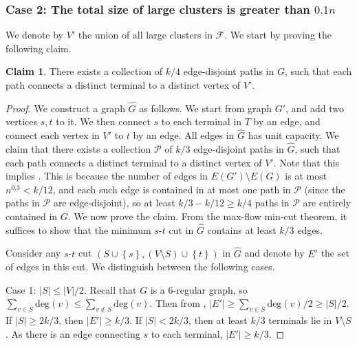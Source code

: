 \documentclass[11pt]{article}
\theoremstyle{definition}
\newtheorem{claim}[theorem]{Claim}
\newcommand{\set}[1]{\left\{ #1 \right\}}
\newcommand{\pset}{{\mathcal{P}}}
\newcommand{\fset}{{\mathcal{F}}}
\def\card#1{\left| #1 \right|}
\def\deg{\textrm{deg}}
\newcounter{note}
\begin{document}
\begin{titlepage}

\subsubsection*{Case 2: The total size of large clusters is greater than $0.1n$}

We denote by $V'$ the union of all large clusters in $\fset$.
We start by proving the following claim.

\begin{claim} \label{clm:paths}
There exists a collection of $k/4$ edge-disjoint paths in $G$, such that each path connects a distinct terminal to a distinct vertex of $V'$.
\end{claim}

\begin{proof}
We construct a graph $\hat G$ as follows. We start from graph $G'$, and add two vertices $s,t$ to it. We then connect $s$ to each terminal in $T$ by an edge, and connect each vertex in $V'$ to $t$ by an edge. All edges in $\hat G$ has unit capacity. We claim that there exists a collection $\pset$ of $k/3$ edge-disjoint paths in $\hat G$, such that each path connects a distinct terminal to a distinct vertex of $V'$. Note that this implies . This is because the number of edges in $E(G')\setminus E(G)$ is at most $n^{0.3}<k/12$, and each such edge is contained in at most one path in $\pset$ (since the paths in $\pset$ are edge-disjoint), so at least $k/3-k/12\ge k/4$ paths in $\pset$ are entirely contained in $G$.
We now prove the claim.
From the max-flow min-cut theorem, it suffices to show that the minimum $s$-$t$ cut in $\hat G$ contains at least $k/3$ edges.


Consider any $s$-$t$ cut $(S \cup \set{s},(V \setminus S) \cup \set{t})$ in $\hat G$ and denote by $E'$ the set of edges in this cut. We distinguish between the following cases.

Case 1: $|S|\le |V|/2$. Recall that $G$ is a $6$-regular graph, so $\sum_{v\in S}\deg(v)\le \sum_{v\notin S}\deg(v)$.
Then from , $|E'|\ge \sum_{v\in S}\deg(v)/2\ge \card{S}/2$. If $\card{S} \ge 2k/3$, then $|E'|\ge k/3$. If $\card{S} < 2k/3$, then at least $k/3$ terminals lie in $V\setminus S$. As there is an edge connecting $s$ to each terminal, $|E'|\ge k/3$. 


\end{proof}
\end{titlepage}
\end{document}
